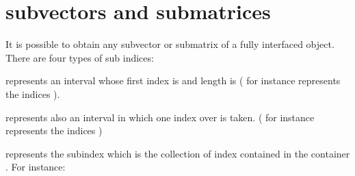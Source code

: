 \documentclass[a4paper,11pt,english]{sphinxmanual}
\begin{document}
\chapter{sub\sphinxhyphen{}vectors and sub\sphinxhyphen{}matrices}
\label{\detokenize{gmm/sub-matrix:sub-vectors-and-sub-matrices}}\label{\detokenize{gmm/sub-matrix:gmm-sub}}\label{\detokenize{gmm/sub-matrix::doc}}
It is possible to obtain any sub\sphinxhyphen{}vector or sub\sphinxhyphen{}matrix of a fully interfaced object. There are four types of sub indices:

\begin{sphinxVerbatim}[commandchars=\\\{\}]
 
\end{sphinxVerbatim}

represents an interval whose first index is  and length is  ( for instance  represents the indices ).

\begin{sphinxVerbatim}[commandchars=\\\{\}]
  
\end{sphinxVerbatim}

represents also an interval in which one index over  is taken. ( for instance  represents the indices )

\begin{sphinxVerbatim}[commandchars=\\\{\}]
 
\end{sphinxVerbatim}

represents the sub\sphinxhyphen{}index which is the collection of index contained in the container . For instance:

\begin{sphinxVerbatim}[commandchars=\\\{\}]
 
\PYG{p}{[}\PYG{p}{]}   \PYG{p}{[}\PYG{p}{]}   \PYG{p}{[}\PYG{p}{]}  
\end{sphinxVerbatim}
\end{document}
